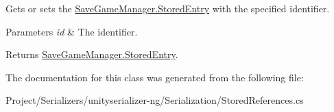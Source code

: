 Gets or sets the \hyperlink{class_save_game_manager_1_1_stored_entry}{Save\+Game\+Manager.\+Stored\+Entry} with the specified identifier. 


\begin{DoxyParams}{Parameters}
{\em id} & The identifier.\\
\hline
\end{DoxyParams}
\begin{DoxyReturn}{Returns}
\hyperlink{class_save_game_manager_1_1_stored_entry}{Save\+Game\+Manager.\+Stored\+Entry}.
\end{DoxyReturn}


The documentation for this class was generated from the following file\+:\begin{DoxyCompactItemize}
\item 
Project/\+Serializers/unityserializer-\/ng/\+Serialization/Stored\+References.\+cs\end{DoxyCompactItemize}
